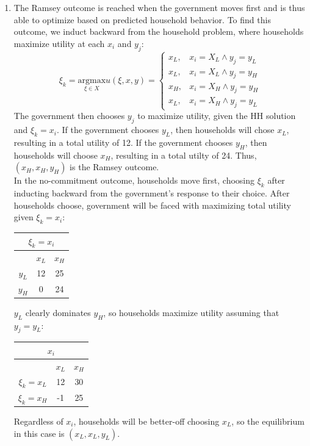 \documentclass{article}
\begin{document}
\begin{enumerate}
	\item The Ramsey outcome is reached when the government moves first and is thus able to optimize based on predicted household behavior. To find this outcome, we induct backward from the household problem, where households maximize utility at each $x_i$ and $y_j$:
		\[
			\xi_k = \underset{\xi\in X}{\text{argmax}}u(\xi,x,y) =
			\begin{cases}
				x_L, &	x_i = X_L\land y_j=y_L\\
				x_L, &	x_i = X_L\land y_j=y_H\\
				x_H, &	x_i = X_H\land y_j=y_H\\
				x_L, &	x_i = X_H\land y_j=y_L
			\end{cases}
		\]
		The government then chooses $y_j$ to maximize utility, given the HH solution and $\xi_k=x_i$. If the government chooses $y_L$, then households will chose $x_L$, resulting in a total utility of 12. If the government chooses $y_H$, then households will choose $x_H$, resulting in a total utilty of 24. Thus, $(x_H,x_H,y_H)$ is the Ramsey outcome.
		\medskip \\
		In the no-commitment outcome, households move first, choosing $\xi_k$ after inducting backward from the government's response to their choice. After households choose, government will be faced with maximizing total utility given $\xi_k=x_i$:
		\begin{center}
			\begin{tabular}{|c|c|c|}
				\multicolumn{3}{c}{$\xi_k=x_i$}	\\ \hline
						& $x_L$ & $x_H$ \\ \hline 
				$y_L$	& 12 & 25 		\\ \hline
				$y_H$	& 0  & 24 		\\ \hline
			\end{tabular} 
		\end{center}
		$y_L$ clearly dominates $y_H$, so households maximize utility assuming that $y_j=y_L$:
		\begin{center}
			\begin{tabular}{|c|c|c|}
					\multicolumn{3}{c}{$x_i$}	\\ \hline
							& $x_L$ & $x_H$ 	\\ \hline 
				$\xi_k=x_L$	& 12 	& 30 		\\ \hline
				$\xi_k=x_H$	& -1  	& 25 		\\ \hline
			\end{tabular} 
		\end{center}
		Regardless of $x_i$, households will be better-off choosing $x_L$, so the equilibrium in this case is $(x_L,x_L,y_L)$.
		

\end{enumerate}
\end{document}
